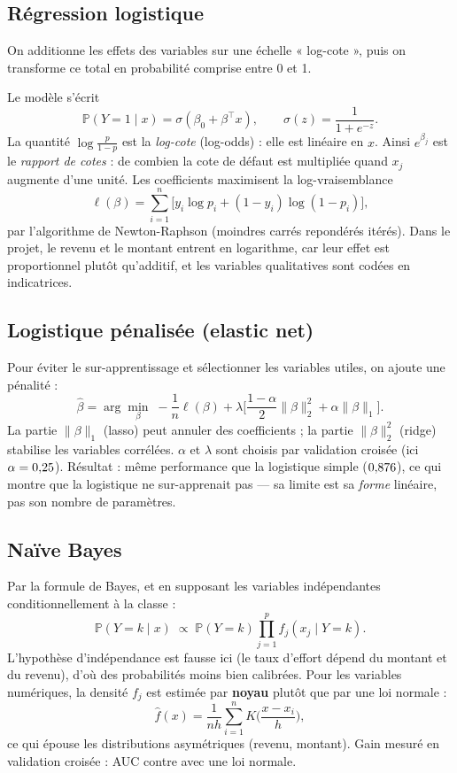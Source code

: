 \documentclass[11pt,a4paper]{article}
\newcommand{\pr}{\mathbb{P}}
\begin{document}
\subsection{Régression logistique}
\begin{intuition}[Intuition]
On additionne les effets des variables sur une échelle « log-cote », puis on transforme ce total en probabilité comprise entre 0 et 1.
\end{intuition}
Le modèle s'écrit
\[
\pr(Y=1 \mid x) = \sigma(\beta_0 + \beta^\top x), \qquad \sigma(z) = \frac{1}{1+e^{-z}}.
\]
La quantité $\log\frac{p}{1-p}$ est la \emph{log-cote} (log-odds) : elle est linéaire en $x$. Ainsi $e^{\beta_j}$ est le \emph{rapport de cotes} : de combien la cote de défaut est multipliée quand $x_j$ augmente d'une unité. Les coefficients maximisent la log-vraisemblance
\[
\ell(\beta) = \sum_{i=1}^n \big[ y_i \log p_i + (1-y_i)\log(1-p_i) \big],
\]
par l'algorithme de Newton-Raphson (moindres carrés repondérés itérés). Dans le projet, le revenu et le montant entrent en logarithme, car leur effet est proportionnel plutôt qu'additif, et les variables qualitatives sont codées en indicatrices.

\subsection{Logistique pénalisée (elastic net)}
Pour éviter le sur-apprentissage et sélectionner les variables utiles, on ajoute une pénalité :
\[
\hat\beta = \arg\min_\beta \; -\frac{1}{n}\ell(\beta) + \lambda\Big[\frac{1-\alpha}{2}\lVert\beta\rVert_2^2 + \alpha\lVert\beta\rVert_1\Big].
\]
La partie $\lVert\beta\rVert_1$ (lasso) peut annuler des coefficients ; la partie $\lVert\beta\rVert_2^2$ (ridge) stabilise les variables corrélées. $\alpha$ et $\lambda$ sont choisis par validation croisée (ici $\alpha = 0{,}25$). Résultat : même performance que la logistique simple ($0{,}876$), ce qui montre que la logistique ne sur-apprenait pas — sa limite est sa \emph{forme} linéaire, pas son nombre de paramètres.

\subsection{Naïve Bayes}
Par la formule de Bayes, et en supposant les variables indépendantes conditionnellement à la classe :
\[
\pr(Y=k \mid x) \;\propto\; \pr(Y=k)\prod_{j=1}^p f_j(x_j \mid Y=k).
\]
L'hypothèse d'indépendance est fausse ici (le taux d'effort dépend du montant et du revenu), d'où des probabilités moins bien calibrées. Pour les variables numériques, la densité $f_j$ est estimée par \textbf{noyau} plutôt que par une loi normale :
\[
\hat f(x) = \frac{1}{nh}\sum_{i=1}^n K\Big(\frac{x - x_i}{h}\Big),
\]
ce qui épouse les distributions asymétriques (revenu, montant). Gain mesuré en validation croisée : AUC \aucNbNoyau{} contre \aucNbGauss{} avec une loi normale.
\end{document}
